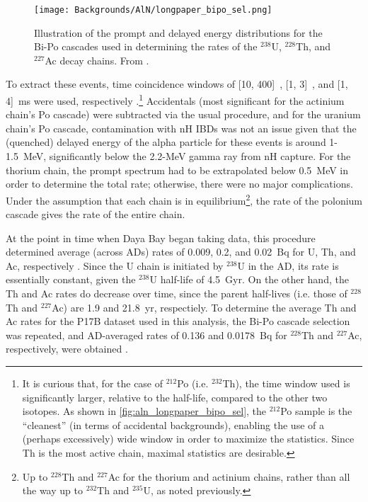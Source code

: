 \documentclass[../thesis.tex]{subfiles}
\begin{document}
\begin{figure}[ht]
  \texttt{[image: Backgrounds/AlN/longpaper\_bipo\_sel.png]}
  \caption{Illustration of the prompt and delayed energy distributions for the Bi-Po cascades used in determining the rates of the $^{238}$U, $^{228}$Th, and $^{227}$Ac decay chains. From \cite{An_2017}.}
  \label{fig:aln_longpaper_bipo_sel}
\end{figure}

To extract these events, time coincidence windows of [10, 400]~\us, [1, 3]~\us, and [1, 4]~ms were used, respectively \cite{An_2017}.\footnote{It is curious that, for the case of $^{212}$Po (i.e. $^{232}$Th), the time window used is significantly larger, relative to the half-life, compared to the other two isotopes. As shown in \autoref{fig:aln_longpaper_bipo_sel}, the $^{212}$Po sample is the ``cleanest'' (in terms of accidental backgrounds), enabling the use of a (perhaps excessively) wide window in order to maximize the statistics. Since Th is the most active chain, maximal statistics are desirable.} Accidentals (most significant for the actinium chain's Po cascade) were subtracted via the usual procedure,
and for the uranium chain's Po cascade, contamination with nH IBDs was not an issue given that the (quenched) delayed energy of the alpha particle for these events is around 1-1.5~MeV, significantly below the 2.2-MeV gamma ray from nH capture. For the thorium chain, the prompt spectrum had to be extrapolated below 0.5~MeV in order to determine the total rate; otherwise, there were no major complications. Under the assumption that each chain is in equilibrium\footnote{Up to $^{228}$Th and $^{227}$Ac for the thorium and actinium chains, rather than all the way up to $^{232}$Th and $^{235}$U, as noted previously.}, the rate of the polonium cascade gives the rate of the entire chain.

At the point in time when Daya Bay began taking data, this procedure determined average (across ADs) rates of 0.009, 0.2, and 0.02~Bq for U, Th, and Ac, respectively \cite{lianghongBkg}. Since the U chain is initiated by $^{238}$U in the AD, its rate is essentially constant, given the $^{238}$U half-life of 4.5~Gyr. On the other hand, the Th and Ac rates do decrease over time, since the parent half-lives (i.e. those of $^{228}$Th and $^{227}$Ac) are 1.9 and 21.8~yr, respectiely. To determine the average Th and Ac rates for the P17B dataset used in this analysis, the Bi-Po cascade selection was repeated, and AD-averaged rates of 0.136 and 0.0178~Bq for $^{228}$Th and $^{227}$Ac, respectively, were obtained \cite{lianghongBkg}.
\end{document}
